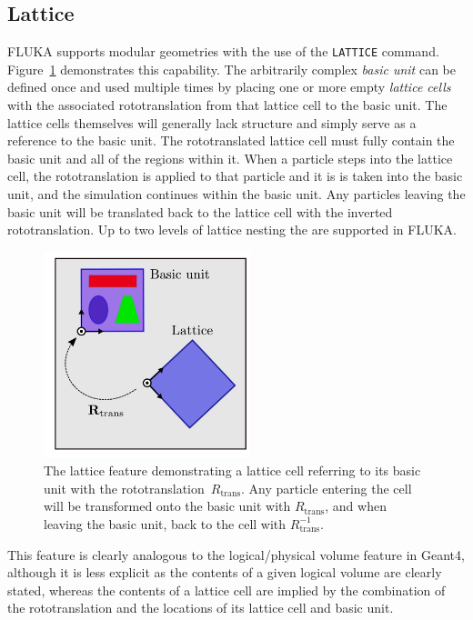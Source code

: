 \documentclass[final,5p,times,twocolumn]{elsarticle}
\newcommand{\fluka}[1]{\texttt{\MakeUppercase{#1}}}
\begin{document}
\subsection{Lattice}

FLUKA supports modular geometries with the use of the \fluka{lattice}
command. Figure~\ref{fig:lattice} demonstrates this capability. The
arbitrarily complex \emph{basic unit} can be defined once and used
multiple times by placing one or more empty \emph{lattice cells} with the
associated rototranslation from that lattice cell to the basic
unit. The lattice cells themselves will generally lack structure
and simply serve as a reference to the basic unit. The rototranslated
lattice cell must fully contain the basic unit and all of the regions
within it. When a particle steps into the lattice cell, the
rototranslation is applied to that particle and it is is taken into the
basic unit, and the simulation continues within the basic unit. Any
particles leaving the basic unit will be translated back to the
lattice cell with the inverted rototranslation. Up to two
levels of lattice nesting the are supported in FLUKA.

\begin{figure}[hbtp]
\begin{center}
\includegraphics[width=6cm]{./diagrams/lattice}
\caption{The lattice feature demonstrating a lattice cell
  referring to its basic unit with the rototranslation~$R_\textrm{trans}$.
  Any particle entering the cell will be transformed onto the basic unit
  with $R_\textrm{trans}$, and when leaving the basic unit, back to the cell
  with $R_\textrm{trans}^{-1}$.}
\label{fig:lattice}
\end{center}
\end{figure}
This feature is clearly analogous to the logical/physical volume feature in
Geant4, although it is less explicit as the contents of a given logical
volume are clearly stated, whereas the contents of a lattice cell
are implied by the combination of the rototranslation and the locations of
its lattice cell and basic unit.
\end{document}
